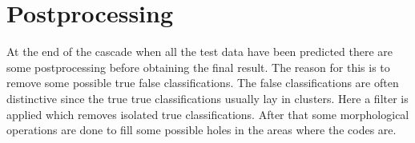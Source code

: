 \section{Postprocessing}
\label{Postprocessing}
At the end of the cascade when all the test data have been predicted there are some postprocessing before obtaining the final result. The reason for this is to remove some possible true false classifications. The false classifications are often distinctive since the true true classifications usually lay in clusters. Here a filter is applied which removes isolated true classifications. After that some morphological operations are done to fill some possible holes in the areas where the codes are.

